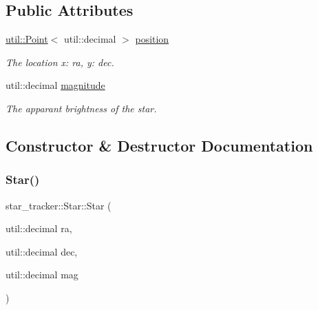 \subsection*{Public Attributes}
\begin{DoxyCompactItemize}
\item 
\mbox{\label{classstar__tracker_1_1Star_a972fcfe86aa2a6efdda7cacb113a724b}} 
\hyperlink{classutil_1_1Point}{util\+::\+Point}$<$ util\+::decimal $>$ \hyperlink{classstar__tracker_1_1Star_a972fcfe86aa2a6efdda7cacb113a724b}{position}
\begin{DoxyCompactList}\small\item\em The location x\+: ra, y\+: dec. \end{DoxyCompactList}\item 
\mbox{\label{classstar__tracker_1_1Star_ac6c60d291656abb740271f124ad6467d}} 
util\+::decimal \hyperlink{classstar__tracker_1_1Star_ac6c60d291656abb740271f124ad6467d}{magnitude}
\begin{DoxyCompactList}\small\item\em The apparant brightness of the star. \end{DoxyCompactList}\end{DoxyCompactItemize}


\subsection{Constructor \& Destructor Documentation}
\mbox{\label{classstar__tracker_1_1Star_a371887a36edc9ede4cf3a1ce34d6a9a0}} 
\subsubsection{\texorpdfstring{Star()}{Star()}}
{\footnotesize\ttfamily star\+\_\+tracker\+::\+Star\+::\+Star (\begin{DoxyParamCaption}\item[{util\+::decimal}]{ra,  }\item[{util\+::decimal}]{dec,  }\item[{util\+::decimal}]{mag }\end{DoxyParamCaption})\hspace{0.3cm}{\ttfamily [inline]}}



